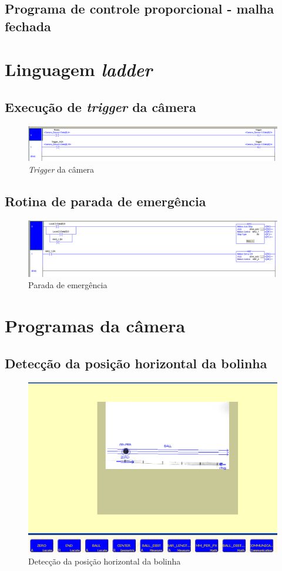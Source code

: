 \subsection{Programa de controle proporcional - malha fechada}
\label{mfprogST}


\section{Linguagem \textit{ladder}}
\subsection{Execução de \textit{trigger} da câmera}
\label{laddertrigger}
\begin{figure}[!ht]
\centering
\includegraphics[width=\linewidth]{figs/ladder/camera_trigger}
\caption{\textit{Trigger} da câmera}
\end{figure}

\subsection{Rotina de parada de emergência}
\label{emergencyladder}
\begin{figure}[!ht]
\centering
\includegraphics[width=\linewidth]{figs/ladder/parada}
\caption{Parada de emergência}
\end{figure}

\section{Programas da câmera}
\subsection{Detecção da posição horizontal da bolinha}
\label{ballhorzpos}
\begin{figure}[!ht]
\centering
\includegraphics[width=\linewidth]{figs/presence/programaCaptura}
\caption{Detecção da posição horizontal da bolinha}
\end{figure}